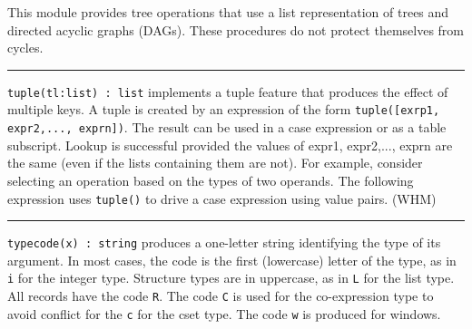 This module provides tree operations that use a list representation of
trees and directed acyclic graphs (DAGs). These procedures do not
protect themselves from cycles. 

\vspace{0.25cm}\hrule{}

\texttt{tuple(tl:list) : list} implements a
{\textquotedbl}tuple{\textquotedbl} feature that produces the effect of
multiple keys. A tuple is created by an expression of the form
\texttt{tuple([exrp1, expr2,..., exprn])}. The result can be used in a
case expression or as a table subscript. Lookup
is successful provided the values of expr1, expr2,..., exprn are the
same (even if the lists containing them are not). For example, consider
selecting an operation based on the types of two operands. The
following expression uses \texttt{tuple()} to drive a case expression
using value pairs. (WHM)


\vspace{0.25cm}\hrule{}

\texttt{typecode(x) : string} produces a one-letter string identifying
the type of its argument. In most cases, the code is the first
(lowercase) letter of the type, as in
\texttt{{\textquotedbl}i{\textquotedbl}} for the integer type.
Structure types are in uppercase, as in
\texttt{{\textquotedbl}L{\textquotedbl}} for the list type. All records
have the code \texttt{{\textquotedbl}R{\textquotedbl}}. The code
\texttt{{\textquotedbl}C{\textquotedbl}} is used for the co-expression
type to avoid conflict for the \texttt{{\textquotedbl}c{\textquotedbl}}
for the cset type. The code \texttt{{\textquotedbl}w{\textquotedbl}} is
produced for windows. 


